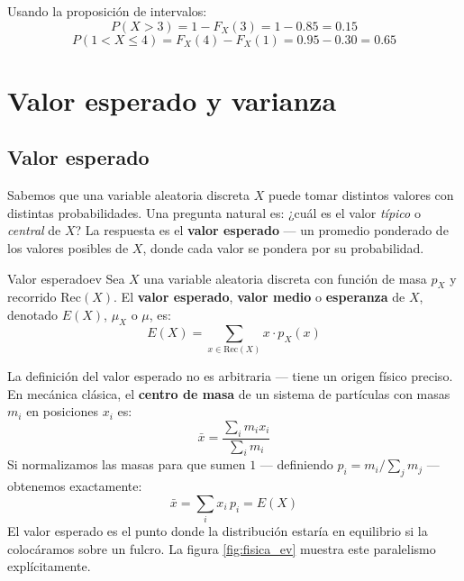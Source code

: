 \documentclass[12pt, a4paper]{book}
\numberwithin{equation}{chapter}
\begin{document}
Usando la proposición de intervalos:
\[
P(X > 3) = 1 - F_X(3) = 1 - 0.85 = 0.15
\]
\[
P(1 < X \leq 4) = F_X(4) - F_X(1) = 0.95 - 0.30 = 0.65
\]

\section{Valor esperado y varianza}

\subsection{Valor esperado}

Sabemos que una variable aleatoria discreta $X$ puede tomar distintos 
valores con distintas probabilidades. Una pregunta natural es: ¿cuál 
es el valor \textit{típico} o \textit{central} de $X$? La respuesta 
es el \textbf{valor esperado} — un promedio ponderado de los valores 
posibles de $X$, donde cada valor se pondera por su probabilidad.

\begin{definicion}{Valor esperado}{ev}
	Sea $X$ una variable aleatoria discreta con función de masa 
	$p_X$ y recorrido $\text{Rec}(X)$. El \textbf{valor esperado}, 
	\textbf{valor medio} o \textbf{esperanza} de $X$, denotado 
	$E(X)$, $\mu_X$ o $\mu$, es:
	\[
	E(X) = \sum_{x \in \text{Rec}(X)} x \cdot p_X(x)
	\]
\end{definicion}

La definición del valor esperado no es arbitraria — tiene un origen 
físico preciso. En mecánica clásica, el \textbf{centro de masa} de un 
sistema de partículas con masas $m_i$ en posiciones $x_i$ es:
\[
\bar{x} = \frac{\sum_i m_i x_i}{\sum_i m_i}
\]
Si normalizamos las masas para que sumen $1$ — definiendo $p_i = 
m_i / \sum_j m_j$ — obtenemos exactamente:
\[
\bar{x} = \sum_i x_i\, p_i = E(X)
\]
El valor esperado es el punto donde la distribución estaría en 
equilibrio si la colocáramos sobre un fulcro. La figura 
\ref{fig:fisica_ev} muestra este paralelismo explícitamente.
\end{document}
